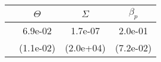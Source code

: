 \begin{table}[ht]
\centering
\begin{tabular}{cccc}
  \hline
 & $\Theta$ & $\Sigma$ & $\beta_{p}$ \\ 
  \hline
 & 6.9e-02 & 1.7e-07 & 2.0e-01 \\ 
   & (1.1e-02) & (2.0e+04) & (7.2e-02) \\ 
   \hline
\end{tabular}
\end{table}
